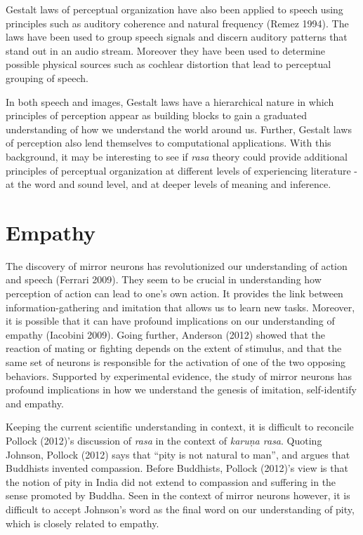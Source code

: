 Gestalt laws of perceptual organization have also been applied to speech using principles such as auditory coherence and natural frequency (Remez 1994). The laws have been used to group speech signals and discern auditory patterns that stand out in an audio stream. Moreover they have been used to determine possible physical sources such as cochlear distortion that lead to perceptual grouping of speech.

In both speech and images, Gestalt laws have a hierarchical nature in which principles of perception appear as building blocks to gain a graduated understanding of how we understand the world around us. Further, Gestalt laws of perception also lend themselves to computational applications. With this background, it may be interesting to see if \textsl{rasa} theory could provide additional principles of perceptual organization at different levels of experiencing literature - at the word and sound level, and at deeper levels of meaning and inference.

\section*{Empathy}

The discovery of mirror neurons has revolutionized our understanding of action and speech (Ferrari 2009). They seem to be crucial in understanding how perception of action can lead to one’s own action. It provides the link between information-gathering and imitation that allows us to learn new tasks. Moreover, it is possible that it can have profound implications on our understanding of empathy (Iacobini 2009). Going further, Anderson (2012) showed that the reaction of mating or fighting depends on the extent of stimulus, and that the same set of neurons is responsible for the activation of one of the two opposing behaviors. Supported by experimental evidence, the study of mirror neurons has profound implications in how we understand the genesis of imitation, self-identify and empathy. 

Keeping the current scientific understanding in context, it is difficult to reconcile Pollock (2012)’s discussion of \textsl{rasa} in the context of \textsl{karuṇa rasa}. Quoting Johnson, Pollock (2012) says that “pity is not natural to man”, and argues that Buddhists invented compassion. Before Buddhists, Pollock (2012)’s view is that the notion of pity in India did not extend to compassion and suffering in the sense promoted by Buddha. Seen in the context of mirror neurons however, it is difficult to accept Johnson’s word as the final word on our understanding of pity, which is closely related to empathy.

